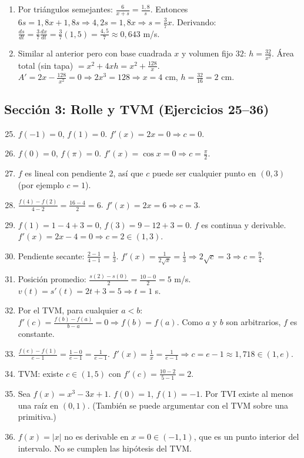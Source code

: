 \documentclass[12pt, a4paper]{article}
\begin{document}
\begin{enumerate}[leftmargin=*, label=\textbf{\arabic*.}]
  \item Por triángulos semejantes: $\frac{6}{x + s} = \frac{1{,}8}{s}$. Entonces $6s = 1{,}8x + 1{,}8s \Rightarrow 4{,}2s = 1{,}8x \Rightarrow s = \frac{3}{7}x$. Derivando: $\frac{ds}{dt} = \frac{3}{7}\frac{dx}{dt} = \frac{3}{7}(1{,}5) = \frac{4{,}5}{7} \approx 0{,}643$ m/s.
  \item Similar al anterior pero con base cuadrada $x$ y volumen fijo $32$: $h = \frac{32}{x^2}$. Área total (sin tapa) $= x^2 + 4xh = x^2 + \frac{128}{x}$. $A' = 2x - \frac{128}{x^2} = 0 \Rightarrow 2x^3 = 128 \Rightarrow x = 4$ cm, $h = \frac{32}{16} = 2$ cm.
\end{enumerate}

\subsection*{Sección 3: Rolle y TVM (Ejercicios 25--36)}

\begin{enumerate}[leftmargin=*, label=\textbf{\arabic*.}]
  \setcounter{enumi}{24}
  \item $f(-1) = 0$, $f(1) = 0$. $f'(x) = 2x = 0 \Rightarrow c = 0$.
  \item $f(0) = 0$, $f(\pi) = 0$. $f'(x) = \cos x = 0 \Rightarrow c = \frac{\pi}{2}$.
  \item $f$ es lineal con pendiente 2, así que $c$ puede ser cualquier punto en $(0, 3)$ (por ejemplo $c = 1$).
  \item $\frac{f(4) - f(2)}{4 - 2} = \frac{16 - 4}{2} = 6$. $f'(x) = 2x = 6 \Rightarrow c = 3$.
  \item $f(1) = 1 - 4 + 3 = 0$, $f(3) = 9 - 12 + 3 = 0$. $f$ es continua y derivable. $f'(x) = 2x - 4 = 0 \Rightarrow c = 2 \in (1, 3)$.
  \item Pendiente secante: $\frac{2 - 1}{4 - 1} = \frac{1}{3}$. $f'(x) = \frac{1}{2\sqrt{x}} = \frac{1}{3} \Rightarrow 2\sqrt{c} = 3 \Rightarrow c = \frac{9}{4}$.
  \item Posición promedio: $\frac{s(2) - s(0)}{2} = \frac{10 - 0}{2} = 5$ m/s. $v(t) = s'(t) = 2t + 3 = 5 \Rightarrow t = 1$ s.
  \item Por el TVM, para cualquier $a < b$: $f'(c) = \frac{f(b) - f(a)}{b - a} = 0 \Rightarrow f(b) = f(a)$. Como $a$ y $b$ son arbitrarios, $f$ es constante.
  \item $\frac{f(e) - f(1)}{e - 1} = \frac{1 - 0}{e - 1} = \frac{1}{e - 1}$. $f'(x) = \frac{1}{x} = \frac{1}{e - 1} \Rightarrow c = e - 1 \approx 1{,}718 \in (1, e)$.
  \item TVM: existe $c \in (1, 5)$ con $f'(c) = \frac{10 - 2}{5 - 1} = 2$.
  \item Sea $f(x) = x^3 - 3x + 1$. $f(0) = 1$, $f(1) = -1$. Por TVI existe al menos una raíz en $(0,1)$. (También se puede argumentar con el TVM sobre una primitiva.)
  \item $f(x) = |x|$ no es derivable en $x = 0 \in (-1, 1)$, que es un punto interior del intervalo. No se cumplen las hipótesis del TVM.
\end{enumerate}
\end{document}
